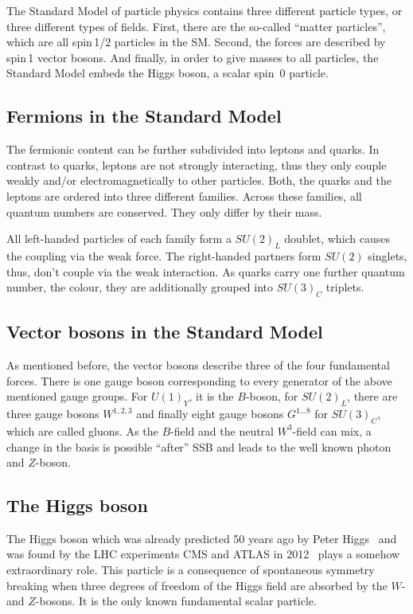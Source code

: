 The Standard Model of particle physics contains three different particle types, or three different types of fields.
First, there are the so-called ``matter particles'', which are all spin\,1/2 particles in the SM.
Second, the forces are described by spin\,1 vector bosons.
And finally, in order to give masses to all particles, the Standard Model embeds the Higgs boson, a scalar spin~0 particle.

\subsection*{Fermions in the Standard Model}
The fermionic content can be further subdivided into leptons and quarks.
In contrast to quarks, leptons are not strongly interacting, thus they only couple weakly and/or electromagnetically to other particles. 
Both, the quarks and the leptons are ordered into three different families.
Across these families, all quantum numbers are conserved.
They only differ by their mass.

All left-handed particles of each family form a $SU(2)_L$ doublet, which causes the coupling via the weak force.
The right-handed partners form $SU(2)$ singlets, thus, don't couple via the weak interaction.
As quarks carry one further quantum number, the colour, they are additionally grouped into $SU(3)_C$ triplets.


\subsection*{Vector bosons in the Standard Model}
As mentioned before, the vector bosons describe three of the four fundamental forces.
There is one gauge boson corresponding to every generator of the above mentioned gauge groups.
For $U(1)_Y$, it is the $B$-boson, for $SU(2)_L$, there are three gauge bosons $W^{1,2,3}$ and finally eight gauge bosons $G^{1...8}$ for $SU(3)_C$, which are called gluons.
As the $B$-field and the neutral $W^3$-field can mix, a change in the basis is possible ``after'' SSB and leads to the well known photon and $Z$-boson.

\subsection*{The Higgs boson}
The Higgs boson which was already predicted 50 years ago by Peter Higgs~\cite{bib:Higgs_Prediction,bib:Higgs_Prediction_2} and was found by the LHC experiments CMS and ATLAS in 2012~\cite{bib:Theory:CMS:HiggsObservation,bib:Theory:Atlas:HiggsObservation} plays a somehow extraordinary role.
This particle is a consequence of spontaneous symmetry breaking when three degrees of freedom of the Higgs field are absorbed by the $W$-and $Z$-bosons.
It is the only known fundamental scalar particle.\\


